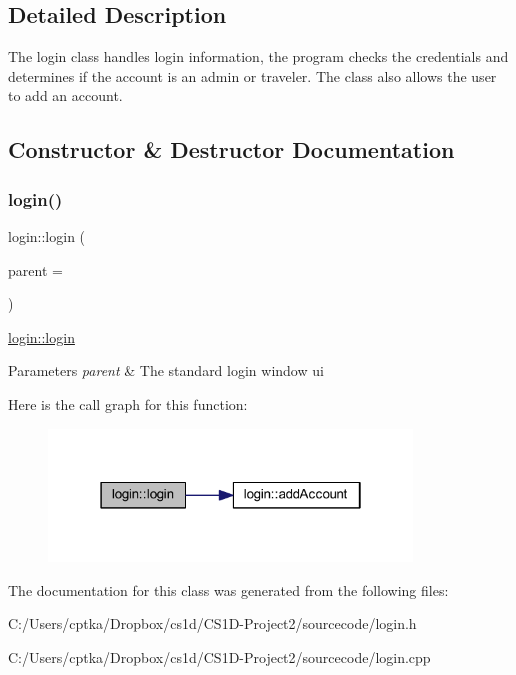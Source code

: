 \subsection{Detailed Description}
The login class handles login information, the program checks the credentials and determines if the account is an admin or traveler. The class also allows the user to add an account. 

\subsection{Constructor \& Destructor Documentation}
\mbox{\label{classlogin_a4bea95f394a7f5709d79b13455881602}} 
\subsubsection{\texorpdfstring{login()}{login()}}
{\footnotesize\ttfamily login\+::login (\begin{DoxyParamCaption}\item[{Q\+Widget $\ast$}]{parent = {} }\end{DoxyParamCaption})\hspace{0.3cm}{\ttfamily [explicit]}}



\mbox{\hyperlink{classlogin_a4bea95f394a7f5709d79b13455881602}{login\+::login}} 


\begin{DoxyParams}{Parameters}
{\em parent} & The standard login window ui \\
\hline
\end{DoxyParams}
Here is the call graph for this function\+:
\nopagebreak
\begin{figure}[H]
\begin{center}
\leavevmode
\includegraphics[width=274pt]{classlogin_a4bea95f394a7f5709d79b13455881602_cgraph}
\end{center}
\end{figure}


The documentation for this class was generated from the following files\+:\begin{DoxyCompactItemize}
\item 
C\+:/\+Users/cptka/\+Dropbox/cs1d/\+C\+S1\+D-\/\+Project2/sourcecode/login.\+h\item 
C\+:/\+Users/cptka/\+Dropbox/cs1d/\+C\+S1\+D-\/\+Project2/sourcecode/login.\+cpp\end{DoxyCompactItemize}
